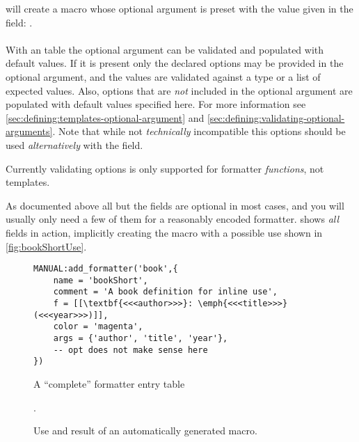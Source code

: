 \documentclass[12pt]{scrartcl}
\begin{document}
\noindent will create a macro whose optional argument is preset with the value
given in the  field:
\texttt{}.


\paragraph{}

With an  table the optional argument can be validated and
populated with default values.  If it is present only the declared options may
be provided in the optional argument, and the values are validated against a
type or a list of expected values.  Also, options that are \emph{not} included
in the optional argument are populated with default values specified here. For
more information see \vref{sec:defining:templates-optional-argument} and
\vref{sec:defining:validating-optional-arguments}.  Note that while not
\emph{technically} incompatible this options should be used \emph{alternatively}
with the  field.

 Currently validating options is only supported for formatter
\emph{functions}, not templates.

\bigskip

As documented above all but the  fields are optional in most cases,
and you will usually only need a few of them for a reasonably encoded formatter.
 shows \emph{all} fields in action, implicitly creating the
macro  with a possible use shown in
\vref{fig:bookShortUse}.

\begin{figure}
\begin{verbatim}
MANUAL:add_formatter('book',{
    name = 'bookShort',
    comment = 'A book definition for inline use',
    f = [[\textbf{<<<author>>>}: \emph{<<<title>>>} (<<<year>>>)]],
    color = 'magenta',
    args = {'author', 'title', 'year'},
    -- opt does not make sense here
})
\end{verbatim}
\caption{A “complete” formatter entry table}
\label{fig:bookShort}
\end{figure}

\begin{figure}
.
\caption{Use and result of an automatically generated macro.}
\label{fig:bookShortUse}
\end{figure}
\end{document}
